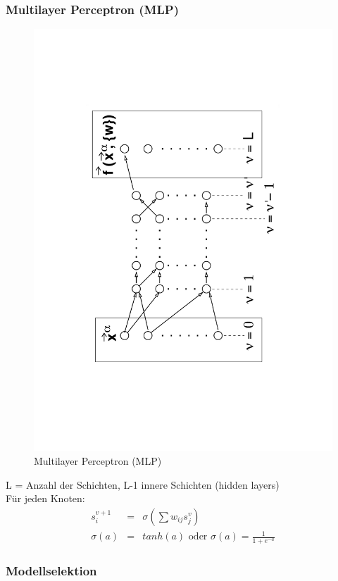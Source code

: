 	\subsubsection{Multilayer Perceptron (MLP)}
	\begin{figure}[ht]
		\vspace*{-40pt}
		\centering
		\includegraphics[angle=-90, width=.9\textwidth]{img/mlp}
		\vspace*{-40pt}
		\caption{Multilayer Perceptron (MLP)}
		\label{deployment}
	\end{figure}
	L = Anzahl der Schichten, L-1 innere Schichten (\dq hidden layers\dq)\\[5pt]
	Für jeden Knoten: %
	\begin{eqnarray*}
		s_i^{v+1} &=& \sigma(\sum w_{ij}s_j^v)\\
		\sigma(a) &=& tanh(a) \text{ oder } \sigma(a) = \frac{1}{1+e^{-a}}
	\end{eqnarray*}
	\subsubsection{Modellselektion}

